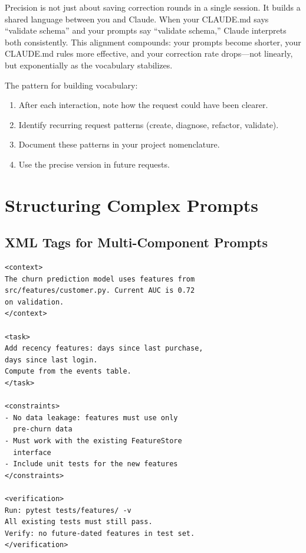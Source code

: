 \begin{whybox}
Precision is not just about saving correction rounds in a single session.
It builds a shared language between you and Claude. When your CLAUDE.md
says ``validate schema'' and your prompts say ``validate schema,''
Claude interprets both consistently. This alignment compounds:
your prompts become shorter, your CLAUDE.md rules more effective,
and your correction rate drops---not linearly, but exponentially
as the vocabulary stabilizes.
\end{whybox}

The pattern for building vocabulary:
\begin{enumerate}
  \item After each interaction, note how the request could have been clearer.
  \item Identify recurring request patterns (create, diagnose, refactor, validate).
  \item Document these patterns in your project nomenclature.
  \item Use the precise version in future requests.
\end{enumerate}


\section{Structuring Complex Prompts}
\label{sec:structure}

\subsection{XML Tags for Multi-Component Prompts}


\begin{verbatim}
<context>
The churn prediction model uses features from
src/features/customer.py. Current AUC is 0.72
on validation.
</context>

<task>
Add recency features: days since last purchase,
days since last login.
Compute from the events table.
</task>

<constraints>
- No data leakage: features must use only
  pre-churn data
- Must work with the existing FeatureStore
  interface
- Include unit tests for the new features
</constraints>

<verification>
Run: pytest tests/features/ -v
All existing tests must still pass.
Verify: no future-dated features in test set.
</verification>
\end{verbatim}

